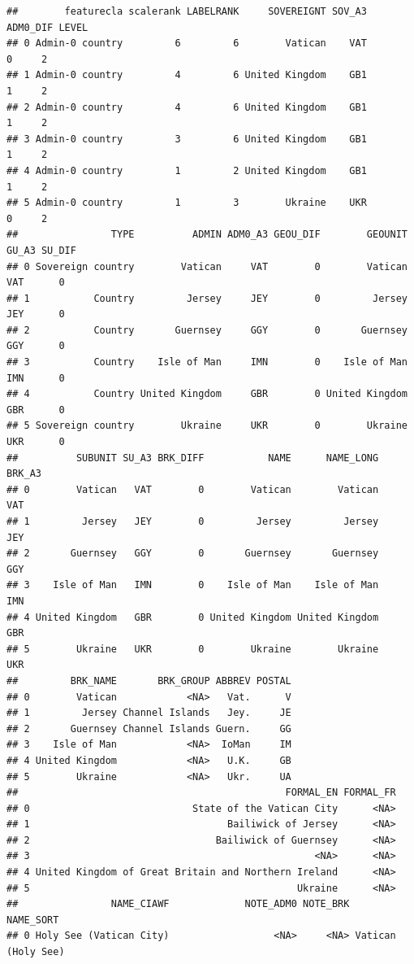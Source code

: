 \documentclass[
]{book}
\begin{document}
\begin{verbatim}
##        featurecla scalerank LABELRANK     SOVEREIGNT SOV_A3 ADM0_DIF LEVEL
## 0 Admin-0 country         6         6        Vatican    VAT        0     2
## 1 Admin-0 country         4         6 United Kingdom    GB1        1     2
## 2 Admin-0 country         4         6 United Kingdom    GB1        1     2
## 3 Admin-0 country         3         6 United Kingdom    GB1        1     2
## 4 Admin-0 country         1         2 United Kingdom    GB1        1     2
## 5 Admin-0 country         1         3        Ukraine    UKR        0     2
##                TYPE          ADMIN ADM0_A3 GEOU_DIF        GEOUNIT GU_A3 SU_DIF
## 0 Sovereign country        Vatican     VAT        0        Vatican   VAT      0
## 1           Country         Jersey     JEY        0         Jersey   JEY      0
## 2           Country       Guernsey     GGY        0       Guernsey   GGY      0
## 3           Country    Isle of Man     IMN        0    Isle of Man   IMN      0
## 4           Country United Kingdom     GBR        0 United Kingdom   GBR      0
## 5 Sovereign country        Ukraine     UKR        0        Ukraine   UKR      0
##          SUBUNIT SU_A3 BRK_DIFF           NAME      NAME_LONG BRK_A3
## 0        Vatican   VAT        0        Vatican        Vatican    VAT
## 1         Jersey   JEY        0         Jersey         Jersey    JEY
## 2       Guernsey   GGY        0       Guernsey       Guernsey    GGY
## 3    Isle of Man   IMN        0    Isle of Man    Isle of Man    IMN
## 4 United Kingdom   GBR        0 United Kingdom United Kingdom    GBR
## 5        Ukraine   UKR        0        Ukraine        Ukraine    UKR
##         BRK_NAME       BRK_GROUP ABBREV POSTAL
## 0        Vatican            <NA>   Vat.      V
## 1         Jersey Channel Islands   Jey.     JE
## 2       Guernsey Channel Islands Guern.     GG
## 3    Isle of Man            <NA>  IoMan     IM
## 4 United Kingdom            <NA>   U.K.     GB
## 5        Ukraine            <NA>   Ukr.     UA
##                                              FORMAL_EN FORMAL_FR
## 0                            State of the Vatican City      <NA>
## 1                                  Bailiwick of Jersey      <NA>
## 2                                Bailiwick of Guernsey      <NA>
## 3                                                 <NA>      <NA>
## 4 United Kingdom of Great Britain and Northern Ireland      <NA>
## 5                                              Ukraine      <NA>
##                NAME_CIAWF             NOTE_ADM0 NOTE_BRK          NAME_SORT
## 0 Holy See (Vatican City)                  <NA>     <NA> Vatican (Holy See)

\end{verbatim}
\end{document}
